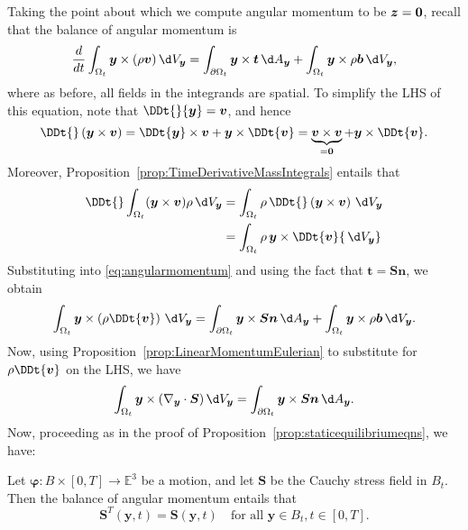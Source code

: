\documentclass[
  letterpaper,
  DIV=11,
  numbers=noendperiod]{scrreprt}
\theoremstyle{plain}
\theoremstyle{remark}
\begin{document}
Taking the point about which we compute angular momentum to be
\({\boldsymbol{z}}=\bf0\), recall that the balance of angular momentum
is \[\label{eq:angularmomentum}
  \frac{d}{dt}\int_{\Omega_t}{\boldsymbol{y}}\times (\rho{\boldsymbol{v}}){\,\d V_{{\boldsymbol{y}}}}=\int_{\partial\Omega_t}{\boldsymbol{y}}\times {\boldsymbol{t}}{\,\d A_{{\boldsymbol{y}}}}+\int_{\Omega_t}{\boldsymbol{y}}\times \rho{\boldsymbol{b}}{\,\d V_{{\boldsymbol{y}}}},\]
where as before, all fields in the integrands are spatial. To simplify
the LHS of this equation, note that
\(\DDt{}{\boldsymbol{y}}= {\boldsymbol{v}}\), and hence
\[\DDt{}\left({\boldsymbol{y}}\times{\boldsymbol{v}}\right) = \DDt{{\boldsymbol{y}}}\times{\boldsymbol{v}}+{\boldsymbol{y}}\times\DDt{{\boldsymbol{v}}} =\underbrace{{\boldsymbol{v}}\times{\boldsymbol{v}}}_{=\bf0}+ {\boldsymbol{y}}\times\DDt{{\boldsymbol{v}}}.\]
Moreover,
Proposition~\hyperref[prop:TimeDerivativeMassIntegrals]{{[}prop:TimeDerivativeMassIntegrals{]}}
entails that \[\begin{aligned}
  \DDt{}\int_{\Omega_t}({\boldsymbol{y}}\times {\boldsymbol{v}})\rho{\,\d V_{{\boldsymbol{y}}}}&= \int_{\Omega_t}\rho\,\DDt{}\left({\boldsymbol{y}}\times{\boldsymbol{v}}\right){\,\d V_{{\boldsymbol{y}}}}\\
&=\int_{\Omega_t}\rho\,{\boldsymbol{y}}\times\DDt{{\boldsymbol{v}}}{\,\d V_{{\boldsymbol{y}}}}
\end{aligned}\] Substituting into
\hyperref[eq:angularmomentum]{{[}eq:angularmomentum{]}} and using the
fact that \({\boldsymbol{t}}={\boldsymbol{S}}{\boldsymbol{n}}\), we
obtain
\[\int_{\Omega_t}{\boldsymbol{y}}\times \left(\rho\DDt{{\boldsymbol{v}}}\right){\,\d V_{{\boldsymbol{y}}}}=\int_{\partial\Omega_t}{\boldsymbol{y}}\times {\boldsymbol{S}}{\boldsymbol{n}}{\,\d A_{{\boldsymbol{y}}}}+\int_{\Omega_t}{\boldsymbol{y}}\times \rho{\boldsymbol{b}}{\,\d V_{{\boldsymbol{y}}}}.\]
Now, using
Proposition~\hyperref[prop:LinearMomentumEulerian]{{[}prop:LinearMomentumEulerian{]}}
to substitute for \(\rho\DDt{\boldsymbol{v}}\) on the LHS, we have
\[\int_{\Omega_t}{\boldsymbol{y}}\times (\nabla_{\boldsymbol{y}}\cdot{\boldsymbol{S}}){\,\d V_{{\boldsymbol{y}}}}=\int_{\partial\Omega_t}{\boldsymbol{y}}\times {\boldsymbol{S}}{\boldsymbol{n}}{\,\d A_{{\boldsymbol{y}}}}.\]
Now, proceeding as in the proof of
Proposition~\hyperref[prop:staticequilibriumeqns]{{[}prop:staticequilibriumeqns{]}},
we have:

Let \({\boldsymbol{\varphi}}:B\times[0,T]\to{\mathbb{E}}^3\) be a
motion, and let \({\boldsymbol{S}}\) be the Cauchy stress field in
\(B_t\). Then the balance of angular momentum entails that
\[{\boldsymbol{S}}^T({\boldsymbol{y}},t)={\boldsymbol{S}}({\boldsymbol{y}},t)\quad\text{for all }{\boldsymbol{y}}\in B_t, t\in[0,T].\]
\end{document}
